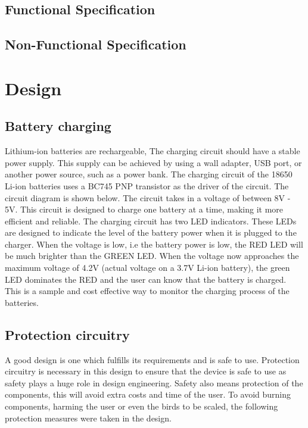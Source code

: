 \documentclass[class=report,11pt,crop=false]{standalone}
\begin{document}
	
	\subsection{Functional Specification}
	\subsection{Non-Functional Specification}
	
	\section{Design}
	\subsection{Battery charging}
	\vspace{0.5cm}
	Lithium-ion batteries are rechargeable,  The charging circuit should have a stable power supply. This supply can be achieved  by using a wall adapter, USB port, or another power source, such as a power bank. The charging circuit of the 18650 Li-ion batteries uses a BC745 PNP transistor as the driver of the circuit. The circuit diagram is shown below. The circuit takes in a voltage of between 8V - 5V. This circuit is designed to charge one battery at a time, making it more efficient and reliable. The charging circuit has two LED indicators. These LEDs are designed to indicate the level of the battery power when it is plugged to the charger. When the voltage is low, i.e the battery power is low, the RED LED will be much brighter than the GREEN LED. When the voltage now approaches the maximum voltage of 4.2V (actual voltage on a 3.7V Li-ion battery), the green LED dominates the RED and the user can know that the battery is charged. This is a sample and cost effective way to monitor the charging process of the batteries.  
	
	\vspace{0.5cm}
	
	\subsection{Protection circuitry}
	
	A good design is one which fulfills its requirements and is safe to use. Protection circuitry is necessary in this design to ensure that the device is safe to use as safety plays a huge role in design engineering. Safety also means protection of the components, this will avoid extra costs and time of the user. To avoid burning components, harming the user or even the birds to be scaled, the following protection measures were taken in the design.
	\vspace{0.5cm}
	
\end{document}
